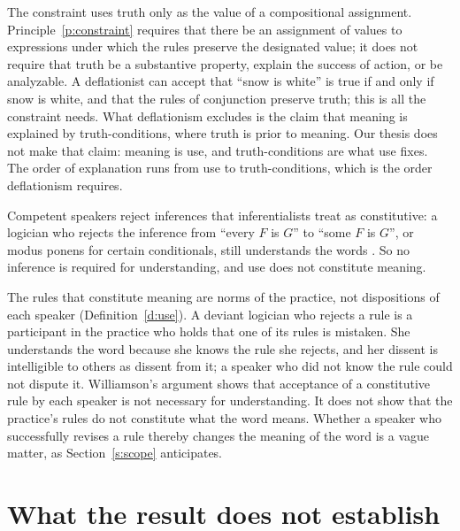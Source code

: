\documentclass{situationist-preprint}
\begin{document}
\begin{reply}
The constraint uses truth only as the value of a compositional assignment. Principle~\ref{p:constraint} requires that there be an assignment of values to expressions under which the rules preserve the designated value; it does not require that truth be a substantive property, explain the success of action, or be analyzable. A deflationist can accept that \enquote{snow is white} is true if and only if snow is white, and that the rules of conjunction preserve truth; this is all the constraint needs. What deflationism excludes is the claim that meaning is explained by truth-conditions, where truth is prior to meaning. Our thesis does not make that claim: meaning is use, and truth-conditions are what use fixes. The order of explanation runs from use to truth-conditions, which is the order deflationism requires.
\end{reply}


\begin{objection}
Competent speakers reject inferences that inferentialists treat as constitutive: a logician who rejects the inference from \enquote{every $F$ is $G$} to \enquote{some $F$ is $G$}, or modus ponens for certain conditionals, still understands the words \citep{Williamson2007}. So no inference is required for understanding, and use does not constitute meaning.
\end{objection}

\begin{reply}
The rules that constitute meaning are norms of the practice, not dispositions of each speaker (Definition~\ref{d:use}). A deviant logician who rejects a rule is a participant in the practice who holds that one of its rules is mistaken. She understands the word because she knows the rule she rejects, and her dissent is intelligible to others as dissent from it; a speaker who did not know the rule could not dispute it. Williamson's argument shows that acceptance of a constitutive rule by each speaker is not necessary for understanding. It does not show that the practice's rules do not constitute what the word means. Whether a speaker who successfully revises a rule thereby changes the meaning of the word is a vague matter, as Section~\ref{s:scope} anticipates.
\end{reply}


\section{What the result does not establish}\label{s:not}
\end{document}
